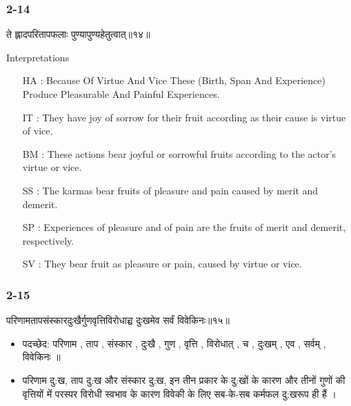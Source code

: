 \begin{frame}[fragile]\frametitle{2-14}
\begin{sanskrit}
ते ह्लादपरितापफलाः पुण्यापुण्यहेतुत्वात्॥१४॥
\end{sanskrit}

Interpretations
\begin{itemize}
\item [HA]: Because Of Virtue And Vice These (Birth, Span And Experience) Produce Pleasurable And Painful Experiences.
\item [IT]: They have joy of sorrow for their fruit according as their cause is virtue of vice.
\item [BM]: These actions bear joyful or sorrowful fruits according to the actor’s virtue or vice.
\item [SS]: The karmas bear fruits of pleasure and pain caused by merit and demerit.
\item [SP]: Experiences of pleasure and of pain are the fruits of merit and demerit, respectively.
\item [SV]: They bear fruit as pleasure or pain, caused by virtue or vice. 
\end{itemize}
	
\end{frame}


\begin{frame}[fragile]\frametitle{2-15}
\begin{sanskrit}
परिणामतापसंस्कारदुःखैर्गुणवृत्तिविरोधाच्च दुःखमेव सर्वं विवेकिनः॥१५॥
\end{sanskrit}

	\begin{itemize}
	\item पदच्छेद: परिणाम , ताप , संस्कार , दुःखै , गुण , वृत्ति , विरोधात् , च , दुःखम् , एव , सर्वम् , विवेकिनः ॥
	\item परिणाम दु:ख, ताप दु:ख और संस्कार दु:ख, इन तीन प्रकार के दु:खों के कारण और तीनों गुणों की वृत्तियों में परस्पर विरोधी स्वभाव के कारण विवेकी के लिए सब-के-सब कर्मफल दु:खरूप ही हैं ।
	\end{itemize}
	
\end{frame}

